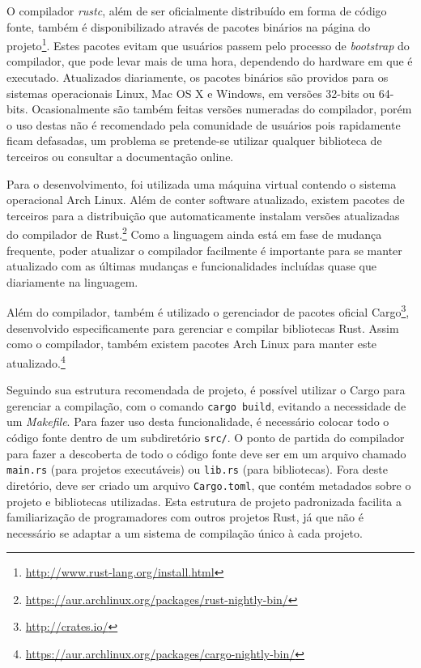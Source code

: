 \documentclass[tg]{mdtufsm}
\begin{document}
O compilador \emph{rustc}, além de ser oficialmente distribuído em forma de código fonte, também é disponibilizado através de pacotes binários na página do projeto\footnote{\url{http://www.rust-lang.org/install.html}}. Estes pacotes evitam que usuários passem pelo processo de \emph{bootstrap} do compilador, que pode levar mais de uma hora, dependendo do hardware em que é executado. Atualizados diariamente, os pacotes binários são providos para os sistemas operacionais Linux, Mac OS X e Windows, em versões 32-bits ou 64-bits. Ocasionalmente são também feitas versões numeradas do compilador, porém o uso destas não é recomendado pela comunidade de usuários pois rapidamente ficam defasadas, um problema se pretende-se utilizar qualquer biblioteca de terceiros ou consultar a documentação online.

Para o desenvolvimento, foi utilizada uma máquina virtual contendo o sistema operacional Arch Linux. Além de conter software atualizado, existem pacotes de terceiros para a distribuição que automaticamente instalam versões atualizadas do compilador de Rust.\footnote{\url{https://aur.archlinux.org/packages/rust-nightly-bin/}} Como a linguagem ainda está em fase de mudança frequente, poder atualizar o compilador facilmente é importante para se manter atualizado com as últimas mudanças e funcionalidades incluídas quase que diariamente na linguagem.

Além do compilador, também é utilizado o gerenciador de pacotes oficial Cargo\footnote{\url{http://crates.io/}}, desenvolvido especificamente para gerenciar e compilar bibliotecas Rust. Assim como o compilador, também existem pacotes Arch Linux para manter este atualizado.\footnote{\url{https://aur.archlinux.org/packages/cargo-nightly-bin/}}

Seguindo sua estrutura recomendada de projeto, é possível utilizar o Cargo para gerenciar a compilação, com o comando \texttt{cargo build}, evitando a necessidade de um \emph{Makefile}. Para fazer uso desta funcionalidade, é necessário colocar todo o código fonte dentro de um subdiretório \texttt{src/}. O ponto de partida do compilador para fazer a descoberta de todo o código fonte deve ser em um arquivo chamado \texttt{main.rs} (para projetos executáveis) ou \texttt{lib.rs} (para bibliotecas). Fora deste diretório, deve ser criado um arquivo \texttt{Cargo.toml}, que contém metadados sobre o projeto e bibliotecas utilizadas. Esta estrutura de projeto padronizada facilita a familiarização de programadores com outros projetos Rust, já que não é necessário se adaptar a um sistema de compilação único à cada projeto.
\end{document}
